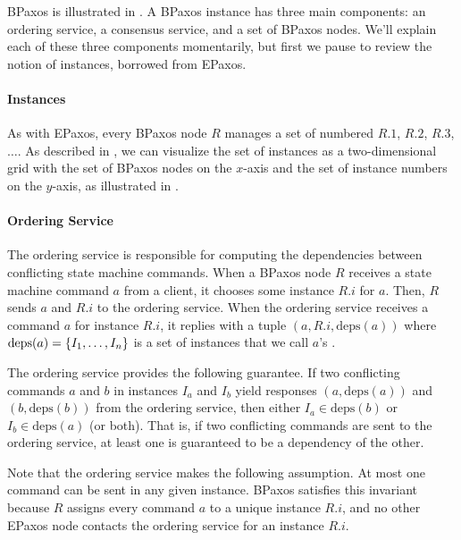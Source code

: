 \documentclass{mwhittaker}
\begin{document}
BPaxos is illustrated in . A BPaxos instance has three main
components: an ordering service, a consensus service, and a set of BPaxos
nodes. We'll explain each of these three components momentarily, but first we
pause to review the notion of instances, borrowed from EPaxos.

{}

\paragraph{Instances}
As with EPaxos, every BPaxos node $R$ manages a set of numbered
 $R.1$, $R.2$, $R.3$, $\ldots$. As described in
\cite{moraru2013there}, we can visualize the set of instances as a
two-dimensional grid with the set of BPaxos nodes on the $x$-axis and the set
of instance numbers on the $y$-axis, as illustrated in
.

{}

\paragraph{Ordering Service}
\newcommand{\deps}[1]{\text{deps}(#1)}

The ordering service is responsible for computing the dependencies between
conflicting state machine commands. When a BPaxos node $R$ receives a state
machine command $a$ from a client, it chooses some instance $R.i$ for $a$.
Then, $R$ sends $a$ and $R.i$ to the ordering service. When the ordering
service receives a command $a$ for instance $R.i$, it replies with a tuple $(a,
R.i, \deps{a})$ where $\deps{a} = \set{I_1, \ldots, I_n}$ is a set of instances
that we call $a$'s .

The ordering service provides the following guarantee. If two conflicting
commands $a$ and $b$ in instances $I_a$ and $I_b$ yield responses $(a,
\deps{a})$ and $(b, \deps{b})$ from the ordering service, then either $I_a \in
\deps{b}$ or $I_b \in \deps{a}$ (or both). That is, if two conflicting commands
are sent to the ordering service, at least one is guaranteed to be a dependency
of the other.

Note that the ordering service makes the following assumption. At most one
command can be sent in any given instance. BPaxos satisfies this invariant
because $R$ assigns every command $a$ to a unique instance $R.i$, and no other
EPaxos node contacts the ordering service for an instance $R.i$.
\end{document}

